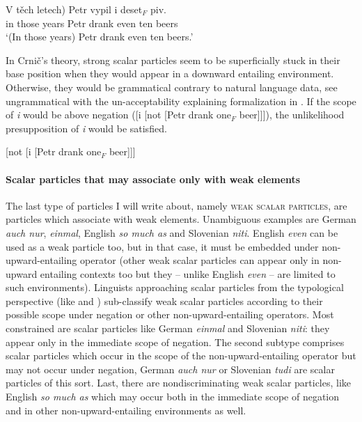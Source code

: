 \documentclass[output=paper,colorlinks,citecolor=brown]{langscibook}
\begin{document}
\ea\label{ex:37} \gll \minsp{(} V těch letech) Petr vypil i deset$_F$ piv.\\
{} in those years Petr drank even ten beers\\
\glt `(In those years) Petr drank even ten beers.'
\z

\noindent In Crnič's theory, strong scalar particles seem to be superficially stuck in their base position when they would appear in a downward entailing environment. Otherwise, they would be grammatical contrary to natural language data, see ungrammatical  with the un-acceptability explaining formalization in . If the scope of \emph{i} would be above negation ({[}i {[}not {[}Petr drank one\(_F\) beer{]}{]}{]}), the unlikelihood presupposition of \emph{i} would be satisfied.

\ea{}
\ex\label{ex:38-b} [not [i [Petr drank one$_F$ beer]]]
\z
\z

\paragraph{Scalar particles that may associate only with weak elements}\label{scalar-particles-that-may-associate-only-with-weak-elements}

The last type of particles I will write about, namely \textsc{weak scalar particles}, are particles which associate with weak elements. Unambiguous examples are German \emph{auch nur}, \emph{einmal}, English \emph{so much as} and Slovenian \emph{niti}. English \emph{even} can be used as a weak particle too, but in that case, it must be embedded under non-upward-entailing operator (other weak scalar particles can appear only in non-upward entailing contexts too but they -- unlike English \emph{even} -- are limited to such environments). Linguists approaching scalar particles from the typological perspective (like \citealt[chapters 4 \& 5]{Crnic2011} and \citealt{gast2011scalar}) sub-classify weak scalar particles according to their possible scope under negation or other non-upward-entailing operators. Most constrained are scalar particles like German \emph{einmal} and Slovenian \emph{niti}: they appear only in the immediate scope of negation. The second subtype comprises scalar particles which occur in the scope of the non-upward-entailing operator but may not occur under negation, German \emph{auch nur} or Slovenian \emph{tudi} are scalar particles of this sort. Last, there are nondiscriminating weak scalar particles, like English \emph{so much as} which may occur both in the immediate scope of negation and in other non-upward-entailing environments as well.
\end{document}
